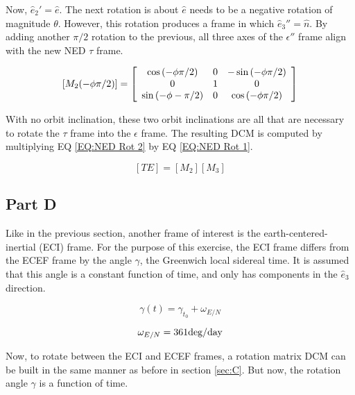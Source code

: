 \documentclass[]{aiaa-tc}%
\newcommand{\brackets} [1] {\left[ #1 \right]}
\newcommand{\arrayb}[2]{\brackets{ \begin{array}{#1}  #2 \end{array} } }
\begin{document}
Now, $\hat{e}_2' = \hat{e}$. The next rotation is about $\hat{e}$ needs to be a negative rotation of magnitude $\theta$. However, this rotation produces a frame in which $\hat{e}_3'' = \hat{n}$. By adding another $\pi/2$ rotation to the previous, all three axes of the $\epsilon''$ frame align with the new NED $\tau$ frame. 

\begin{equation}
	\label{EQ:NED Rot 2}
	[M_2(-\phi\pi/2)] = 
	\arrayb{c c c}{
		\cos{(-\phi\pi/2)} 	& 	0	&	-\sin{(-\phi\pi/2)}	\\
		0				&	1	& 				0	\\
		\sin{(-\phi-\pi/2)}	&	0	& 	\cos{(-\phi\pi/2)} 			
	}
\end{equation}

With no orbit inclination, these two orbit inclinations are all that are necessary to rotate the $\tau$ frame into the $\epsilon$ frame. The resulting DCM is computed by multiplying EQ \ref{EQ:NED Rot 2} by EQ \ref{EQ:NED Rot 1}.

\begin{equation}
	\label{EQ:NED DCM}
	[TE] = [M_2][M_3]%
\end{equation}


\subsection{Part D}
Like in the previous section, another frame of interest is the earth-centered-inertial (ECI) frame. For the purpose of this exercise, the ECI frame differs from the ECEF frame by the angle $\gamma$, the Greenwich local sidereal time. It is assumed that this angle is a constant function of time, and only has components in the $\hat{e}_3$ direction. 

\begin{equation}
		\gamma(t) = \gamma_{t_0} + \omega_{E/N}	
		\label{eq:local sidereal}
\end{equation}

\begin{displaymath}
	\omega_{E/N} = 361 \textnormal{deg/day}
\end{displaymath}

Now, to rotate between the ECI and ECEF frames, a rotation matrix DCM can be built in the same manner as before in section \ref{sec:C}. But now, the rotation angle $\gamma$ is a function of time.
\end{document}
